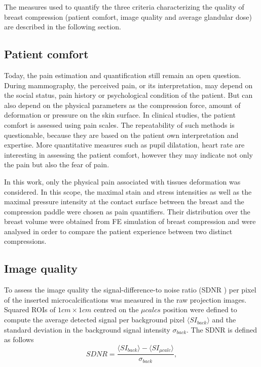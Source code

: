 The measures used to quantify the three criteria characterizing the quality of breast compression (patient comfort, image quality and average glandular dose) are described in the following section.  

\subsection{Patient comfort}

Today, the pain estimation and quantification still remain an open question. During mammography, the perceived pain, or its interpretation, may depend on the social status, pain history or psychological condition of the patient. But can also depend on the physical parameters as the compression force, amount of deformation or pressure on the skin surface. In clinical studies, the patient comfort is assessed using pain scales. The repeatability of such methods is questionable, because they are based on the patient own interpretation and expertise. More quantitative measures such as pupil dilatation, heart rate are interesting in assessing the patient comfort, however they may indicate not only the pain but also the fear of pain.        

In this work, only the physical pain associated with tissues deformation was considered. In this scope, the maximal stain and stress intensities as well as the maximal pressure intensity at the contact surface between the breast and the compression paddle were chosen as pain quantifiers. Their distribution over the breast volume were obtained from FE simulation of breast compression and were analysed in order to compare the patient experience between two distinct compressions. 

\subsection{Image quality }\label{section:averagegalndulardose}
 To assess the image quality the signal-difference-to noise ratio (SDNR ) per pixel of the inserted microcalcifications was measured in the raw projection images. Squared ROIs of $1cm \times 1cm$ centred on the $\mu calcs$ position were defined to compute the average detected signal per background pixel $\langle SI_{back}\rangle$ and the standard deviation in the background signal intensity $\sigma_{back}$. The SDNR is defined as follows
 \begin{equation}
 SDNR = \frac{\langle SI_{back}\rangle - \langle SI_{\mu calc}\rangle}{\sigma_{back}},
\end{equation}


